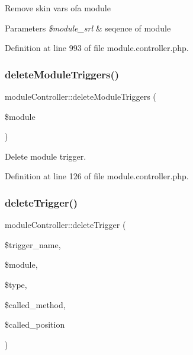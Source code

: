 Remove skin vars ofa module 
\begin{DoxyParams}{Parameters}
{\em \$module\+\_\+srl} & seqence of module \\
\hline
\end{DoxyParams}


Definition at line 993 of file module.\+controller.\+php.

\hypertarget{classmoduleController_a48fb7491a1b86e30895ff4be5df7587d}{}\label{classmoduleController_a48fb7491a1b86e30895ff4be5df7587d} 
\subsubsection{\texorpdfstring{delete\+Module\+Triggers()}{deleteModuleTriggers()}}
{\footnotesize\ttfamily module\+Controller\+::delete\+Module\+Triggers (\begin{DoxyParamCaption}\item[{}]{\$module }\end{DoxyParamCaption})}



Delete module trigger. 



Definition at line 126 of file module.\+controller.\+php.

\hypertarget{classmoduleController_a60dbf5d358cddb566b3d3e297a003d23}{}\label{classmoduleController_a60dbf5d358cddb566b3d3e297a003d23} 
\subsubsection{\texorpdfstring{delete\+Trigger()}{deleteTrigger()}}
{\footnotesize\ttfamily module\+Controller\+::delete\+Trigger (\begin{DoxyParamCaption}\item[{}]{\$trigger\+\_\+name,  }\item[{}]{\$module,  }\item[{}]{\$type,  }\item[{}]{\$called\+\_\+method,  }\item[{}]{\$called\+\_\+position }\end{DoxyParamCaption})}



